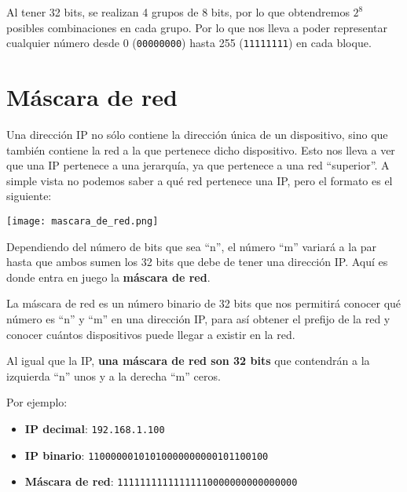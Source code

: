 Al tener 32 bits, se realizan 4 grupos de 8 bits, por lo que obtendremos \textbf{$2^{8}$} posibles combinaciones en cada grupo. Por lo que nos lleva a poder representar cualquier número desde 0 (\texttt{00000000}) hasta 255 (\texttt{11111111}) en cada bloque.



\section{Máscara de red}

Una dirección IP no sólo contiene la dirección única de un dispositivo, sino que también contiene la red a la que pertenece dicho dispositivo. Esto nos lleva a ver que una IP pertenece a una jerarquía, ya que pertenece a una red “superior”. A simple vista no podemos saber a qué red pertenece una IP, pero el formato es el siguiente:

\begin{center}
    \texttt{[image: mascara\_de\_red.png]}
\end{center}

Dependiendo del número de bits que sea “n”, el número “m” variará a la par hasta que ambos sumen los 32 bits que debe de tener una dirección IP. Aquí es donde entra en juego la \textbf{máscara de red}.

La máscara de red es un número binario de 32 bits que nos permitirá conocer qué número es “n” y “m” en una dirección IP, para así obtener el prefijo de la red y conocer cuántos dispositivos puede llegar a existir en la red.

Al igual que la IP, \textbf{una máscara de red son 32 bits} que contendrán a la izquierda “n” unos y a la derecha “m” ceros.


Por ejemplo:
\begin{itemize}
    \item \textbf{IP decimal}:\hspace{22pt} \texttt{192.168.1.100}
    \item \textbf{IP binario}:\hspace{25pt} \texttt{11000000101010000000000101100100}
    \item \textbf{Máscara de red}: \texttt{11111111111111110000000000000000}
\end{itemize}

